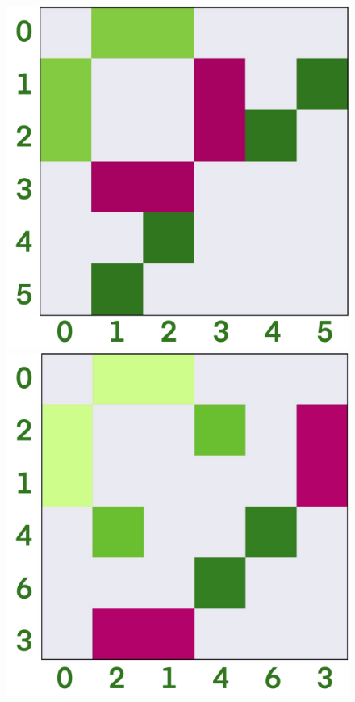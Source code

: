 \begin{figure}
    \begin{center}
    \begin{minipage}{0.45\textwidth}
        \centering
        \includegraphics[width=\textwidth]{results/figures/dipole_no_b.png}
    \end{minipage}\hfill
    \begin{minipage}{0.45\textwidth}
        \includegraphics[width=\textwidth]{results/figures/dipole_yes_b.png}

\end{minipage}
\end{center}
\end{figure}

